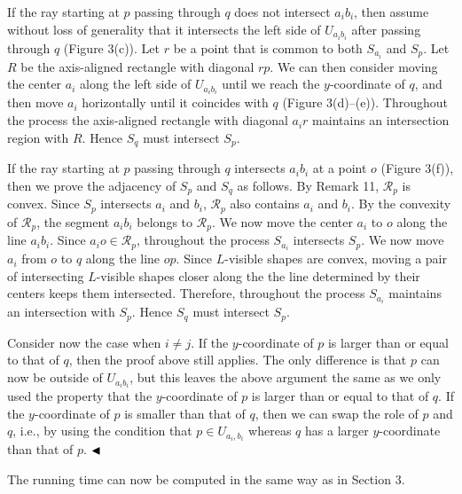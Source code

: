 \par
\par
If the ray starting at $p$ passing through $q$ does not intersect $a_{i}b_{i}$, then assume without loss of generality that it intersects the left side of $U_{a_{i}b_{i}}$ after passing through $q$ (Figure 3(c)). Let $r$ be a point that is common to both $S_{a_{i}}$ and $S_{p}$. Let $R$ be the axis-aligned rectangle with diagonal $rp$. We can then consider moving the center $a_{i}$ along the left side of $U_{a_{i}b_{i}}$ until we reach the $y$-coordinate of $q$, and then move $a_{i}$ horizontally until it coincides with $q$ (Figure 3(d)–(e)). Throughout the process the axis-aligned rectangle with diagonal $a_{i}r$ maintains an intersection region with $R$. Hence $S_{q}$ must intersect $S_{p}$.
\par
\par
If the ray starting at $p$ passing through $q$ intersects $a_{i}b_{i}$ at a point $o$ (Figure 3(f)), then we prove the adjacency of $S_{p}$ and $S_{q}$ as follows. By Remark 11, $\mathcal{R}_{p}$ is convex. Since $S_{p}$ intersects $a_{i}$ and $b_{i}$, $\mathcal{R}_{p}$ also contains $a_{i}$ and $b_{i}$. By the convexity of $\mathcal{R}_{p}$, the segment $a_{i}b_{i}$ belongs to $\mathcal{R}_{p}$. We now move the center $a_{i}$ to $o$ along the line $a_{i}b_{i}$. Since $a_{i}o\in\mathcal{R}_{p}$, throughout the process $S_{a_{i}}$ intersects $S_{p}$. We now move $a_{i}$ from $o$ to $q$ along the line $op$. Since $L$-visible shapes are convex, moving a pair of intersecting $L$-visible shapes closer along the the line determined by their centers keeps them intersected. Therefore, throughout the process $S_{a_{i}}$ maintains an intersection with $S_{p}$. Hence $S_{q}$ must intersect $S_{p}$.
\par
\par
Consider now the case when $i\not=j$. If the $y$-coordinate of $p$ is larger than or equal to that of $q$, then the proof above still applies. The only difference is that $p$ can now be outside of $U_{a_{i}b_{i}}$, but this leaves the above argument the same as we only used the property that the $y$-coordinate of $p$ is larger than or equal to that of $q$. If the $y$-coordinate of $p$ is smaller than that of $q$, then we can swap the role of $p$ and $q$, i.e., by using the condition that $p\in U_{a_{i},b_{i}}$ whereas $q$ has a larger $y$-coordinate than that of $p$. $\hfill\blacktriangleleft$
\par
\par
The running time can now be computed in the same way as in Section 3.
